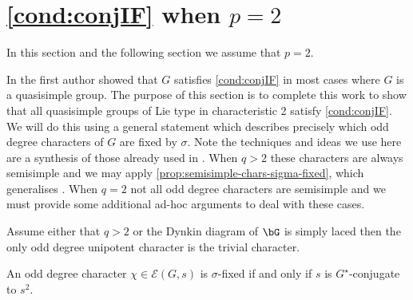 \documentclass[eqthmnum, nocolour]{jt-calcs}
\begin{document}
\section{\cref{cond:conjIF} when $p=2$}\label{sec:p2IF}
\begin{assumption}
In this section and the following section we assume that $p=2$.
\end{assumption}

\begin{pa}
In \cite[\S4.1]{schaeffer-fry:2015:odd-degree-characters} the first author showed that $G$ satisfies \cref{cond:conjIF} in most cases where $G$ is a quasisimple group. The purpose of this section is to complete this work to show that all quasisimple groups of Lie type in characteristic 2 satisfy \cref{cond:conjIF}. We will do this using a general statement which describes precisely which odd degree characters of $G$ are fixed by $\sigma$. Note the techniques and ideas we use here are a synthesis of those already used in \cite{schaeffer-fry:2015:odd-degree-characters}. When $q > 2$ these characters are always semisimple and we may apply \cref{prop:semisimple-chars-sigma-fixed}, which generalises \cite[4.6]{schaeffer-fry:2015:odd-degree-characters}. When $q = 2$ not all odd degree characters are semisimple and we must provide some additional ad-hoc arguments to deal with these cases.
\end{pa}

\begin{lem}\label{lem:malle}
Assume either that $q>2$ or the Dynkin diagram of $\bG$ is simply laced then the only odd degree unipotent character is the trivial character.
\end{lem}

\begin{prop}\label{prop:odd-degree-fixed}
An odd degree character $\chi \in \mathcal{E}(G,s)$ is $\sigma$-fixed if and only if $s$ is $G^{\star}$-conjugate to $s^2$.
\end{prop}
\end{document}
